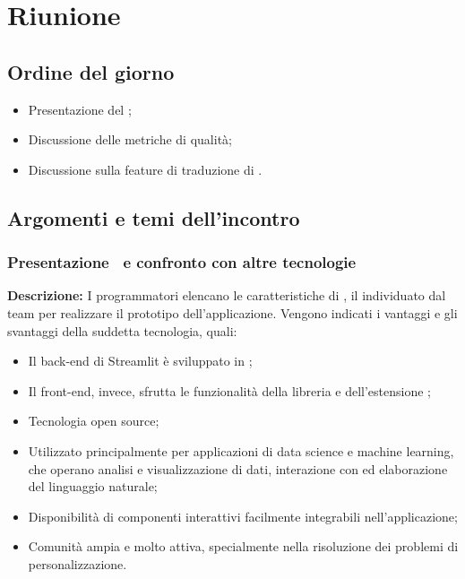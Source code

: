 \section{Riunione}
\subsection{Ordine del giorno}
\begin{itemize}
	\item Presentazione del  ;
	\item Discussione delle metriche di qualità;
	\item Discussione sulla feature di traduzione di .
\end{itemize}

\subsection{Argomenti e temi dell'incontro}

\subsubsection{Presentazione \ e confronto con altre tecnologie}

\par \textbf{Descrizione:} I programmatori elencano le caratteristiche di , il  individuato dal team per realizzare il prototipo dell'applicazione. Vengono indicati i vantaggi e gli svantaggi della suddetta tecnologia, quali:
\begin{itemize}
	\item Il back-end di Streamlit è sviluppato in ;
	\item Il front-end, invece, sfrutta le funzionalità della libreria  e dell'estensione ;
	\item Tecnologia open source;
	\item Utilizzato principalmente per applicazioni di data science e machine learning, che operano analisi e visualizzazione di dati, interazione con  ed elaborazione del linguaggio naturale;
	\item Disponibilità di componenti interattivi facilmente integrabili nell'applicazione;
	\item Comunità ampia e molto attiva, specialmente nella risoluzione dei problemi di personalizzazione.
\end{itemize}


